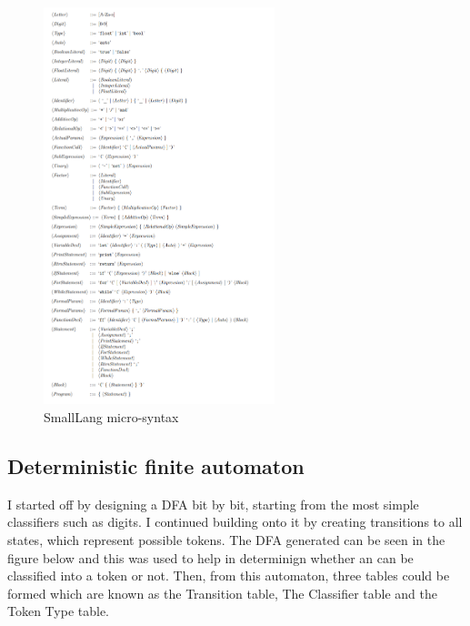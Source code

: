 \documentclass{article}
\begin{document}
				\begin{figure}[H]
			 		\includegraphics[width=0.6\textwidth]{smalllang.png}
			 		\centering
			  		\caption{SmallLang micro-syntax}
			  		\label{fig:smalllang}
				\end{figure}
				
				\subsection{Deterministic finite automaton}
				
				I started off by designing a DFA bit by bit, starting from the most simple classifiers such as digits. I continued building onto it by creating transitions to all states, which represent possible tokens. The DFA generated can be seen in the figure below and this was used to help in determinign whether an can be classified into a token or not. Then, from this automaton, three tables could be formed which are known as the Transition table, The Classifier table and the Token Type table.
				
\end{document}
